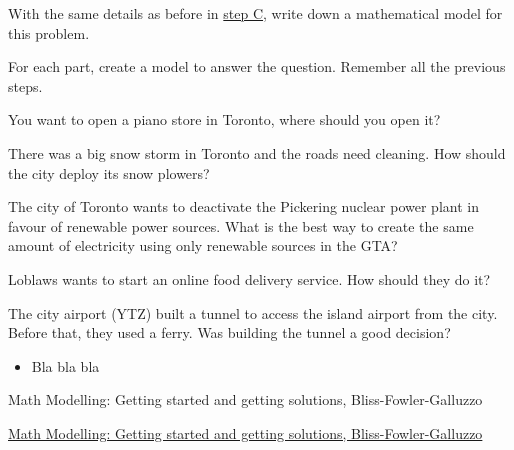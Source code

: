 With the same details as before in \hyperref[assumptions]{step C}, write down a mathematical model for this problem.


\newpage

\question
For each part, create a model to answer the question. Remember all the previous steps.

\begin{parts}\label{models1}
	\item You want to open a piano store in Toronto, where should you open it?
	\item There was a big snow storm in Toronto and the roads need cleaning. How should the city deploy its snow plowers?
	\item The city of Toronto wants to deactivate the Pickering nuclear power plant in favour of renewable power sources. What is the best way to create the same amount of electricity using only renewable sources in the GTA?
	\item Loblaws wants to start an online food delivery service. How should they do it?
	\item The city airport (YTZ) built a tunnel to access the island airport from the city. Before that, they used a ferry. Was building the tunnel a good decision?	
\end{parts}







\begin{module}
	
	\begin{itemize}
		\item Bla bla bla	
	\end{itemize}
	

\begin{annotation}
	\begin{goals}
	Math Modelling: Getting started and getting solutions, Bliss-Fowler-Galluzzo
	
	\hfill {}	
	\end{goals}
\end{annotation}
	 \href{https://m3challenge.siam.org/resources/modeling-handbook}{Math Modelling: Getting started and getting solutions, Bliss-Fowler-Galluzzo}

\end{module}





